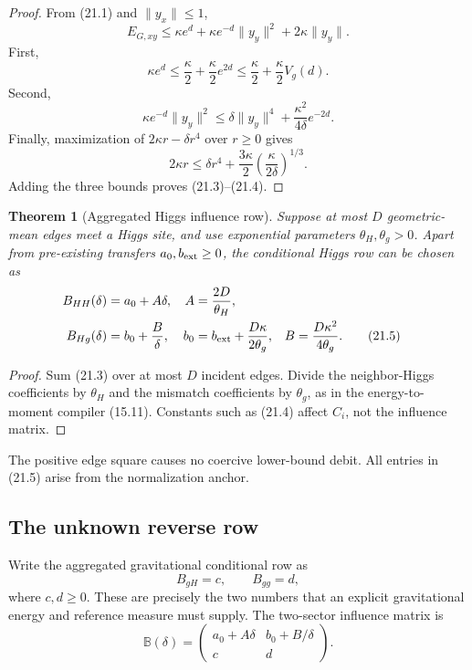 \documentclass[11pt]{article}
\newtheorem{theorem}{Theorem}[section]
\theoremstyle{remark}
\begin{document}
\begin{proof}
From (21.1) and \(\|y_x\|\leq1\),
\[
 E_{G,xy}
 \leq\kappa e^d+\kappa e^{-d}\|y_y\|^2
 +2\kappa\|y_y\|.
\]
First,
\[
 \kappa e^d\leq\frac\kappa2+\frac\kappa2e^{2d}
 \leq\frac\kappa2+\frac\kappa2V_g(d).
\]
Second,
\[
 \kappa e^{-d}\|y_y\|^2
 \leq\delta\|y_y\|^4+
 \frac{\kappa^2}{4\delta}e^{-2d}.
\]
Finally, maximization of
\(2\kappa r-\delta r^4\) over \(r\geq0\) gives
\[
 2\kappa r
 \leq\delta r^4+
 \frac{3\kappa}{2}
 \left(\frac{\kappa}{2\delta}\right)^{1/3}.
\]
Adding the three bounds proves (21.3)--(21.4).
\end{proof}

\begin{theorem}[Aggregated Higgs influence row]
\label{thm:v17v21-higgs-row}
Suppose at most \(D\) geometric-mean edges meet a Higgs site, and
use exponential parameters \(\theta_H,\theta_g>0\).  Apart from
pre-existing transfers \(a_0,b_{\rm ext}\geq0\), the conditional
Higgs row can be chosen as
\[
\begin{aligned}
 B_{HH}(\delta)
 &=a_0+A\delta,
 &A&=\frac{2D}{\theta_H},\\
 B_{Hg}(\delta)
 &=b_0+\frac{B}{\delta},
 &b_0&=b_{\rm ext}+\frac{D\kappa}{2\theta_g},
 &B&=\frac{D\kappa^2}{4\theta_g}.                  \tag{21.5}
\end{aligned}
\]
\end{theorem}

\begin{proof}
Sum (21.3) over at most \(D\) incident edges.  Divide the
neighbor-Higgs coefficients by \(\theta_H\) and the mismatch
coefficients by \(\theta_g\), as in the energy-to-moment compiler
(15.11).  Constants such as (21.4) affect \(C_i\), not the influence
matrix.
\end{proof}

The positive edge square causes no coercive lower-bound debit.
All entries in (21.5) arise from the normalization anchor.

\subsection{The unknown reverse row}

Write the aggregated gravitational conditional row as
\[
 B_{gH}=c,\qquad B_{gg}=d,                          \tag{21.6}
\]
where \(c,d\geq0\).  These are precisely the two numbers that an
explicit gravitational energy and reference measure must supply.
The two-sector influence matrix is
\[
 {\mathbb B}(\delta)
 =
 \begin{pmatrix}
 a_0+A\delta&b_0+B/\delta\\
 c&d
 \end{pmatrix}.                                    \tag{21.7}
\]
\end{document}
